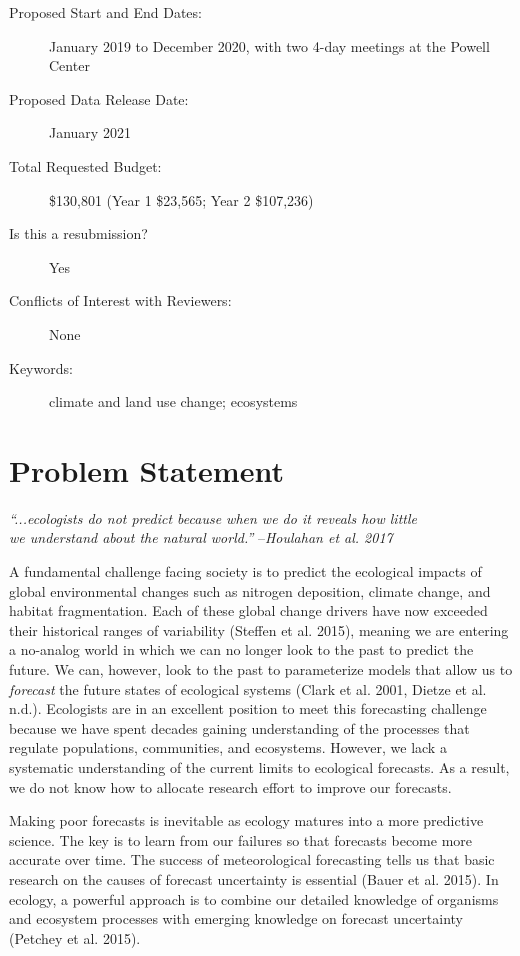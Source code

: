 \documentclass[12pt,]{article}
\begin{document}
\begin{description}
\item[Proposed Start and End Dates:] January 2019 to December 2020, with two 4-day meetings at the Powell Center
\item[Proposed Data Release Date:] January 2021
\item[Total Requested Budget:] \$130,801 (Year 1 \$23,565; Year 2 \$107,236)
\item[Is this a resubmission?] Yes
\item[Conflicts of Interest with Reviewers:] None
\item[Keywords:] climate and land use change; ecosystems
\end{description}

\newpage{}


\section{Problem Statement}\vspace{-1em}\small{}

\phantom{}\hspace{8em}\textit{``...ecologists do not predict because when we do it reveals how little\\\phantom{}\hspace{8em}we understand about the natural world.''}
--\textit{Houlahan et al. 2017}

\normalsize{}\vspace{0.5em}

A fundamental challenge facing society is to predict the ecological
impacts of global environmental changes such as nitrogen deposition,
climate change, and habitat fragmentation. Each of these global change
drivers have now exceeded their historical ranges of variability
(Steffen et al. 2015), meaning we are entering a no-analog world in
which we can no longer look to the past to predict the future. We can,
however, look to the past to parameterize models that allow us to
\emph{forecast} the future states of ecological systems (Clark et al.
2001, Dietze et al. n.d.). Ecologists are in an excellent position to
meet this forecasting challenge because we have spent decades gaining
understanding of the processes that regulate populations, communities,
and ecosystems. However, we lack a systematic understanding of the
current limits to ecological forecasts. As a result, we do not know how
to allocate research effort to improve our forecasts.

Making poor forecasts is inevitable as ecology matures into a more
predictive science. The key is to learn from our failures so that
forecasts become more accurate over time. The success of meteorological
forecasting tells us that basic research on the causes of forecast
uncertainty is essential (Bauer et al. 2015). In ecology, a powerful
approach is to combine our detailed knowledge of organisms and ecosystem
processes with emerging knowledge on forecast uncertainty (Petchey et
al. 2015).
\end{document}
